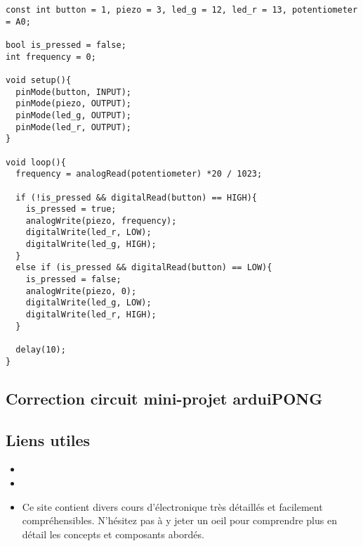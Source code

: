 \begin{tcolorbox}[colback=yellow-atelier!10, colframe=gray!70!black, coltitle=black, colbacktitle=gray!70!white, title={\textit{Bientôt DJ ?}}, leftrule=2mm]
\begin{small}
\begin{verbatim}
const int button = 1, piezo = 3, led_g = 12, led_r = 13, potentiometer = A0;

bool is_pressed = false;
int frequency = 0;

void setup(){
  pinMode(button, INPUT);
  pinMode(piezo, OUTPUT);
  pinMode(led_g, OUTPUT);
  pinMode(led_r, OUTPUT);
}

void loop(){
  frequency = analogRead(potentiometer) *20 / 1023;
  
  if (!is_pressed && digitalRead(button) == HIGH){
    is_pressed = true;
    analogWrite(piezo, frequency);
    digitalWrite(led_r, LOW);
    digitalWrite(led_g, HIGH);
  }
  else if (is_pressed && digitalRead(button) == LOW){
    is_pressed = false;
    analogWrite(piezo, 0);
    digitalWrite(led_g, LOW);
    digitalWrite(led_r, HIGH);
  }
  
  delay(10);
}
\end{verbatim}
\end{small}
\end{tcolorbox}


\clearpage
\subsection{Correction circuit mini-projet arduiPONG}


\clearpage
\subsection{Liens utiles}

\begin{itemize}
	\item {}
	\item {}
	\item {}
		  Ce site contient divers cours d'électronique très détaillés et facilement compréhensibles.
		  N'hésitez pas à y jeter un oeil pour comprendre plus en détail les concepts et composants abordés.
\end{itemize}